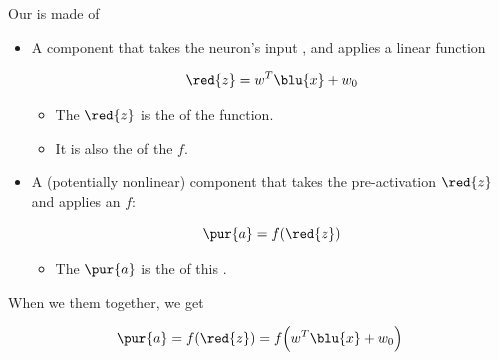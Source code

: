         \begin{definition}
            Our  is made of 
            
            \begin{itemize}
                \item A  component that takes the neuron's input , and applies a linear function  
                
                    \begin{equation*}
                        \red{z} = w^T \blu{x} + w_0
                    \end{equation*}
                    
                    \begin{itemize}
                        \item The  $\red{z}$ is the  of the  function.
                        \item It is also the  of the  $f$.
                    \end{itemize}
                    
                \item A (potentially nonlinear)  component that takes the pre-activation $\red{z}$ and applies an  $f$:
                
                    \begin{equation*}
                        \pur{a} = f(\red{z})
                    \end{equation*}
                    
                    \begin{itemize}
                        \item The  $\pur{a}$ is the  of this .
                    \end{itemize}
            \end{itemize}
            
            When we  them together, we get
            
            \begin{equation*}
                \pur{a} = f(\red{z}) = f \Big(  w^T \blu{x} + w_0 \Big)
            \end{equation*}
            
        \end{definition}
        
